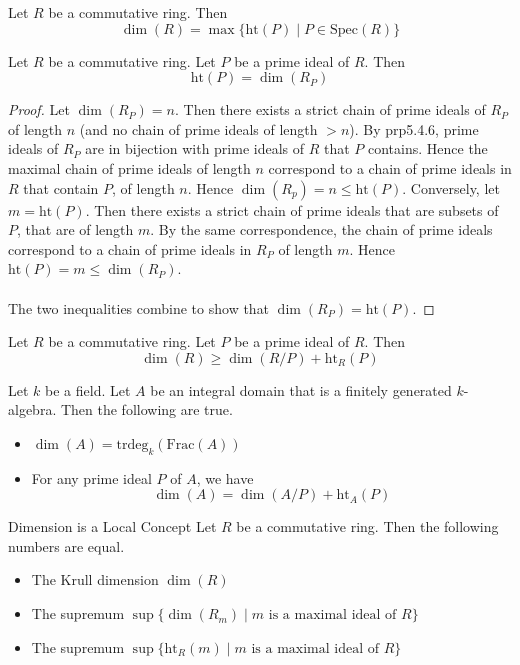 \documentclass[a4paper]{article}
\begin{document}
\begin{lmm}{}{} Let $R$ be a commutative ring. Then $$\dim(R)=\max\{\text{ht}(P)\;|\;P\in\text{Spec}(R)\}$$
\end{lmm}

\begin{lmm}{}{} Let $R$ be a commutative ring. Let $P$ be a prime ideal of $R$. Then $$\text{ht}(P)=\dim(R_P)$$ \tcbline
\begin{proof}
Let $\dim(R_P)=n$. Then there exists a strict chain of prime ideals of $R_P$ of length $n$ (and no chain of prime ideals of length $>n$). By prp5.4.6, prime ideals of $R_P$ are in bijection with prime ideals of $R$ that $P$ contains. Hence the maximal chain of prime ideals of length $n$ correspond to a chain of prime ideals in $R$ that contain $P$, of length $n$. Hence $\dim(R_p)=n\leq\text{ht}(P)$. Conversely, let $m=\text{ht}(P)$. Then there exists a strict chain of prime ideals that are subsets of $P$, that are of length $m$. By the same correspondence, the chain of prime ideals correspond to a chain of prime ideals in $R_P$ of length $m$. Hence $\text{ht}(P)=m\leq\dim(R_P)$. \\~\\

The two inequalities combine to show that $\dim(R_P)=\text{ht}(P)$. 
\end{proof}
\end{lmm}

\begin{lmm}{}{} Let $R$ be a commutative ring. Let $P$ be a prime ideal of $R$. Then $$\dim(R)\geq\dim(R/P)+\text{ht}_R(P)$$
\end{lmm}

\begin{prp}{}{} Let $k$ be a field. Let $A$ be an integral domain that is a finitely generated $k$-algebra. Then the following are true. 
\begin{itemize}
\item $\dim(A)=\text{trdeg}_k(\text{Frac}(A))$
\item For any prime ideal $P$ of $A$, we have $$\dim(A)=\dim(A/P)+\text{ht}_A(P)$$
\end{itemize}
\end{prp}

\begin{prp}{Dimension is a Local Concept}{} Let $R$ be a commutative ring. Then the following numbers are equal. 
\begin{itemize}
\item The Krull dimension $\dim(R)$
\item The supremum $\sup\{\dim(R_m)\;|\;m\text{ is a maximal ideal of }R\}$
\item The supremum $\sup\{\text{ht}_R(m)\;|\;m\text{ is a maximal ideal of }R\}$
\end{itemize}
\end{prp}
\end{document}
